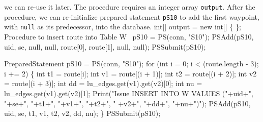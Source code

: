 \documentclass{article}
\def\nwendcode{\endtrivlist \endgroup}      %
\let\nwdocspar=\par
\theoremstyle{definition}                   %
\begin{document}
we can re-use it later. The procedure requires an integer array {\tt{}output}.
After the procedure, we can re-initialize prepared statement {\tt{}pS10} to add the first
waypoint, with {\tt{}null} as its predecessor, into the database.
\nwenddocs{}\endmoddef{}
int[] output = new int[] \{ \};
\LA{}Procedure to insert \code{}route\edoc{} into Table W~{\nwtagstyle{}}\RA{}
pS10 = PS(conn, "S10");
PSAdd(pS10, uid, se, null, null, route[0], route[1], null, null);
PSSubmit(pS10);
\nwendcode{}\nwdocspar
\nwenddocs{}\endmoddef{}
PreparedStatement pS10 = PS(conn, "S10");
for (int i = 0; i < (route.length - 3); i += 2) \{
  int t1 = route[i];
  int v1 = route[(i + 1)];
  int t2 = route[(i + 2)];
  int v2 = route[(i + 3)];
  int dd = lu_edges.get(v1).get(v2)[0];
  int nu = lu_edges.get(v1).get(v2)[1];
  Print("Issue INSERT INTO W VALUES ("+uid+", "+se+", "+t1+", "+v1+", "+t2+", "
    +v2+", "+dd+", "+nu+")");
  PSAdd(pS10, uid, se, t1, v1, t2, v2, dd, nu);
\}
PSSubmit(pS10);
\nwendcode{}\nwdocspar
\end{document}
